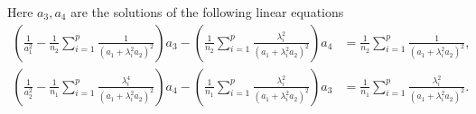 \begin{lemma}
	Here $a_3, a_4$ are the solutions of the following linear equations
	\begin{align}
		\left( \frac1{a_1^2}- \frac1{n_2}\sum_{i=1}^p \frac{1}{ (a_1 + \lambda_i^2a_2)^2  }\right) a_3 -  \left(\frac1{n_2}\sum_{i=1}^p \frac{  \lambda_i^2 }{ (  a_1 + \lambda_i^2a_2)^2  }\right)a_4 &=  \frac1{n_2}\sum_{i=1}^p \frac{1 }{ (  a_1 + \lambda_i^2a_2)^2  } , \label{eq_a3} \\
		\left( \frac1{a_2^2} -  \frac1{n_1}\sum_{i=1}^p \frac{\lambda_i^4   }{  (a_1 + \lambda_i^2a_2)^2  }\right)a_4 -\left( \frac1 {n_1}\sum_{i=1}^p \frac{\lambda_i^2  }{  (a_1 + \lambda_i^2a_2)^2  }\right)a_3 &=   \frac1 {n_1}\sum_{i=1}^p \frac{\lambda_i^2 }{  (a_1 + \lambda_i^2a_2)^2  }. \label{eq_a4}
	\end{align}
\end{lemma}

